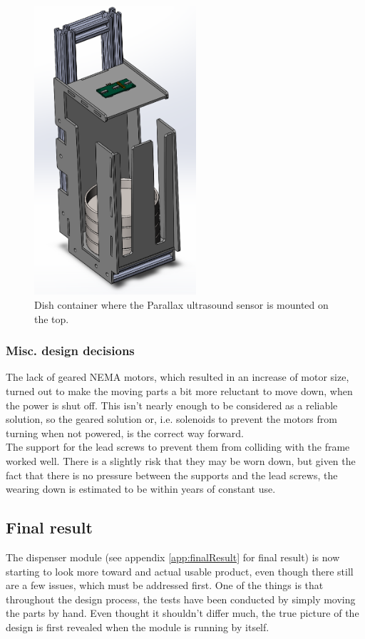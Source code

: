 \documentclass[10pt,a4paper]{article}
\begin{document}
		\begin{figure}
					\includegraphics[width=6cm]{images/dishContainerUsSensor.png}
					\caption{Dish container where the Parallax ultrasound sensor is mounted on the top.}
					\label{fig:dishContainerUsSensor}
				\end{figure}
		\subsubsection{Misc. design decisions}
		The lack of geared NEMA motors, which resulted in an increase of motor size, turned out to make the moving parts a bit more reluctant to move down, when the power is shut off. This isn't nearly enough to be considered as a reliable solution, so the geared solution or, i.e. solenoids to prevent the motors from turning when not powered, is the correct way forward.\\
		
		The support for the lead screws to prevent them from colliding with the frame worked well. There is a slightly risk that they may be worn down, but given the fact that there is no pressure between the supports and the lead screws, the wearing down is estimated to be within years of constant use.
			
			
	\subsection{Final result}
		The dispenser module (see appendix \ref{app:finalResult} for final result) is now starting to look more toward and actual usable product, even though there still are a few issues, which must be addressed first. One of the things is that throughout the design process, the tests have been conducted by simply moving the parts by hand. Even thought it shouldn't differ much, the true picture of the design is first revealed when the module is running by itself.
		
\end{document}
